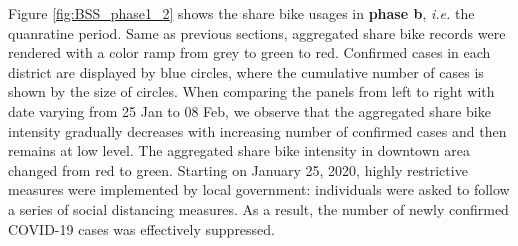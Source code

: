 \documentclass[preprints,ijgi,submit,moreauthors]{Definitions/mdpi}
\begin{document}
Figure \ref{fig:BSS_phase1_2} shows the share bike usages in \textbf{phase b}, \textit{i.e.} the quanratine period.
Same as previous sections, aggregated share bike records were rendered with a color ramp from grey to green to red.
Confirmed cases in each district are displayed by blue circles, where the cumulative number of cases is shown by the size of circles.
When comparing the panels from left to right with date varying from 25 Jan to 08 Feb, we observe that the aggregated share bike intensity gradually decreases with increasing number of confirmed cases and then remains at low level.
The aggregated share bike intensity in downtown area changed from red to green.
Starting on January 25, 2020, highly restrictive measures were implemented by local government: individuals were asked to follow a series of social distancing measures.
As a result, the number of newly confirmed COVID-19 cases was effectively suppressed.
\end{document}
